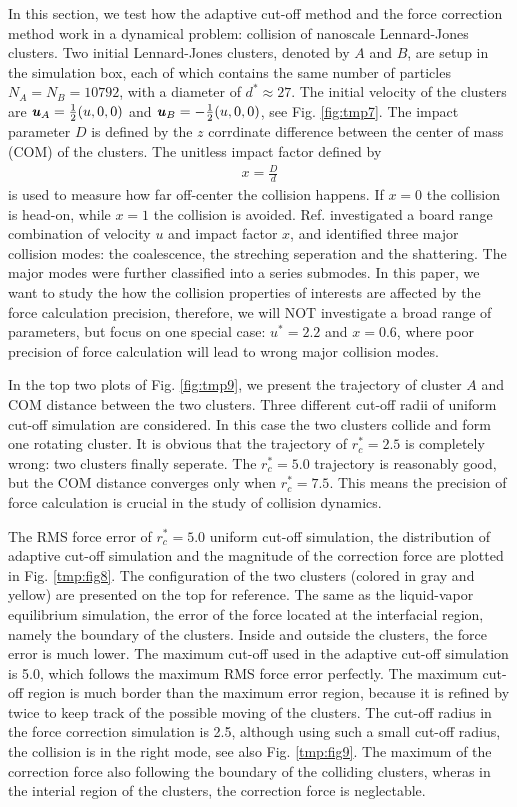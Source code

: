\documentclass[aps,pre,preprint]{revtex4}
\renewcommand{\v}[1]{\textbf{\textit{#1}}}
\begin{document}
In this section, we test how the adaptive cut-off method and the force
correction method work in a dynamical problem: collision of nanoscale
Lennard-Jones clusters. Two initial Lennard-Jones clusters, denoted by
$A$ and $B$, are setup in the simulation box, each of which contains
the same number of particles $N_A = N_B = 10792$, with a diameter of
$d^\ast\approx 27$. The initial velocity of the clusters are $\v u_A =
\frac12(u, 0, 0)$ and $\v u_B = -\frac12(u, 0, 0)$, see
Fig. \ref{fig:tmp7}. The impact parameter $D$ is defined by the $z$
corrdinate difference between the center of mass (COM) of the
clusters. The unitless impact factor defined by
\begin{align}
  x = \frac D d
\end{align}
is used to measure how far off-center the collision happens. If $x =
0$ the collision is head-on, while $x=1$ the collision is avoided.
Ref. \cite{kalweit2006collision} investigated a board range
combination of velocity $u$ and impact factor $x$, and identified
three major collision modes: the coalescence, the streching seperation
and the shattering. The major modes were further classified into a
series submodes. In this paper, we want to study the how the collision
properties of interests are affected by the force calculation
precision, therefore, we will NOT investigate a broad range of
parameters, but focus on one special case: $u^\ast = 2.2$ and $x =
0.6$, where poor precision of force calculation will lead to wrong
major collision modes.

In the top two plots of Fig. \ref{fig:tmp9}, we present the trajectory
of cluster $A$ and COM distance between the two clusters.  Three
different cut-off radii of uniform cut-off simulation are considered.
In this case the two clusters collide and form one rotating cluster.
It is obvious that the trajectory of $r_c^\ast = 2.5$ is completely
wrong: two clusters finally seperate. The $r_c^\ast = 5.0$ trajectory
is reasonably good, but the COM distance converges only when $r_c^\ast
= 7.5$. This means the precision of force calculation is crucial in
the study of collision dynamics.

The RMS force error of $r_c^\ast = 5.0$ uniform cut-off simulation,
the distribution of adaptive cut-off simulation and the magnitude of
the correction force are plotted in Fig. \ref{tmp:fig8}.  The
configuration of the two clusters (colored in gray and yellow) are
presented on the top for reference. The same as the liquid-vapor
equilibrium simulation, the error of the force located at the
interfacial region, namely the boundary of the clusters. Inside and
outside the clusters, the force error is much lower.  The maximum
cut-off used in the adaptive cut-off simulation is 5.0, which follows
the maximum RMS force error perfectly. The maximum cut-off region is
much border than the maximum error region, because it is refined by
twice to keep track of the possible moving of the clusters.  The
cut-off radius in the force correction simulation is 2.5, although
using such a small cut-off radius, the collision is in the right mode,
see also Fig. \ref{tmp:fig9}. The maximum of the correction force also
following the boundary of the colliding clusters, wheras in the interial
region of the clusters, the correction force is neglectable. 
\end{document}
